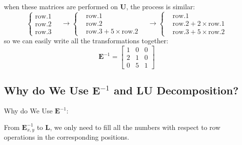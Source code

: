         when these matrices are performed on \textbf{U}, the process is similar:
            \begin{equation}
                \left\{
                \begin{aligned}
                    \mathrm{row}.1\\
                    \mathrm{row}.2\\
                    \mathrm{row}.3
                \end{aligned}
                \right.
                \quad \rightarrow
                \left\{
                \begin{aligned}
                    &\mathrm{row}.1\\
                    &\mathrm{row}.2 \\
                    &\mathrm{row}.3 + 5 \times \mathrm{row}.2
                \end{aligned}
                \right.
                \quad \rightarrow
                \left\{
                \begin{aligned}
                    &\mathrm{row}.1\\
                    &\mathrm{row}.2 + 2 \times \mathrm{row}.1 \\
                    &\mathrm{row}.3 + 5 \times \mathrm{row}.2
                \end{aligned}
                \right.
            \end{equation}
        so we can easily write all the transformations together:
            \begin{equation}
                \mathbf{E}^{-1}  = 
                \begin{bmatrix}
                            1 & 0 & 0\\
                            2 & 1 & 0\\
                            \boxed{0} & 5 & 1
                        \end{bmatrix}
            \end{equation}
        
    \subsection{Why do We Use $\mathbf{E}^{-1}$ and LU Decomposition?}
        Why do We Use $\mathbf{E}^{-1}$: 
        
        From $\mathbf{E}_{x,y}^{-1}$ to \textbf{L}, 
        we only need to fill all the numbers with respect to row operations in the corresponding positions.

